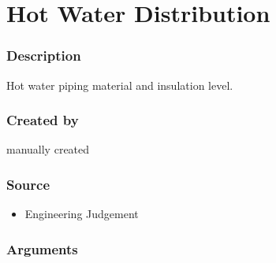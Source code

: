 \section{Hot Water Distribution}\label{hot_water_distribution}

\subsubsection{Description}\label{description-92}

Hot water piping material and insulation level.

\subsubsection{Created by}\label{created-by-92}

manually created

\subsubsection{Source}\label{source-91}

\begin{itemize}
 
\item
  Engineering Judgement
\end{itemize}

\subsubsection{Arguments}\label{arguments-59}

